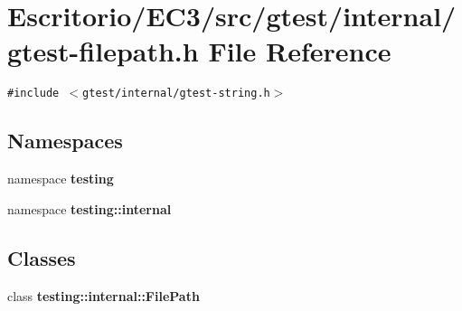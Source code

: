 \section{Escritorio/EC3/src/gtest/internal/gtest-filepath.h File Reference}
\label{gtest-filepath_8h}
{\tt \#include $<$gtest/internal/gtest-string.h$>$}\par
\subsection*{Namespaces}
\begin{CompactItemize}
\item 
namespace {\bf testing}
\item 
namespace {\bf testing::internal}
\end{CompactItemize}
\subsection*{Classes}
\begin{CompactItemize}
\item 
class {\bf testing::internal::FilePath}
\end{CompactItemize}
